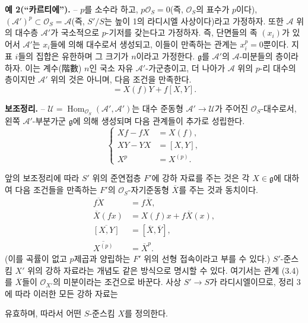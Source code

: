 \textbf{예 2(“카르티에”).} -- $p$를 소수라 하고,
$p\mathcal O_S=0$(즉, $\mathcal O_S$의 표수가 $p$이다),
$(\mathcal A')^p\subset\mathcal O_S=\mathcal A$(즉, $S'/S$는 높이 1의
라디시엘 사상이다)라고 가정하자. 또한 $\mathcal A$ 위의 대수층
$\mathcal A'$가 국소적으로 $p$-기저를 갖는다고 가정하자. 즉, 단면들의
족 $(x_i)$가 있어서 $\mathcal A'$는 $x_i$들에 의해 대수로서 생성되고,
이들이 만족하는 관계는 $x_i^p=0$뿐이다. 지표 $i$들의 집합은 유한하며
그 크기가 $n$이라고 가정한다. $\mathfrak g$를 $\mathcal A'$의
$\mathcal A$-미분들의 층이라 하자. 이는 계수(階數) $n$인 국소 자유
$\mathcal A'$-가군층이고, 더 나아가 $\mathcal A$ 위의 $p$-리 대수의
층이지만 $\mathcal A'$ 위의 것은 아니며, 다음 조건을 만족한다.
\begin{equation}
  [X,fY]=X(f)Y+f[X,Y].
  \tag{3.5}
\end{equation}

\textbf{보조정리.} -- $\mathcal U=
\operatorname{Hom}_{\mathcal O_S}(\mathcal A',\mathcal A')$는 대수 준동형
$\mathcal A'\longrightarrow\mathcal U$가 주어진 $\mathcal O_S$-대수로서,
왼쪽 $\mathcal A'$-부분가군 $\mathfrak g$에 의해 생성되며 다음 관계들이
추가로 성립한다.
\begin{equation}
  \left\{
  \begin{aligned}
    Xf-fX&=X(f),\\
    XY-YX&=[X,Y],\\
    X^p&=X^{(p)}.
  \end{aligned}
  \right.
  \tag{3.6}
\end{equation}

앞의 보조정리에 따라 $S'$ 위의 준연접층 $F'$에 강하 자료를 주는 것은
각 $X\in\mathfrak g$에 대하여 다음 조건들을 만족하는 $F'$의
$\mathcal O_S$-자기준동형 $\overline X$를 주는 것과 동치이다.
\begin{align}
  \overline{fX}&=f\overline X, \tag{3.7}\\
  \overline X(fx)&=X(f)x+f\overline X(x), \tag{3.8}\\
  \overline{[X,Y]}&=[\overline X,\overline Y], \tag{3.9}\\
  \overline{X^{(p)}}&=\overline X^p. \tag{3.10}
\end{align}
(이를 곡률이 없고 $p$제곱과 양립하는 $F'$ 위의 선형 접속이라고 부를 수
있다.) $S'$-준스킴 $X'$ 위의 강하 자료라는 개념도 같은 방식으로 명시할 수
있다. 여기서는 관계 (3.4)를 $\overline X$들이 $\mathcal O_{X'}$의
미분이라는 조건으로 바꾼다. 사상 $S'\longrightarrow S$가 라디시엘이므로,
정리 3에 따라 이러한 모든 강하 자료는

유효하며, 따라서 어떤 $S$-준스킴 $X$를 정의한다.

